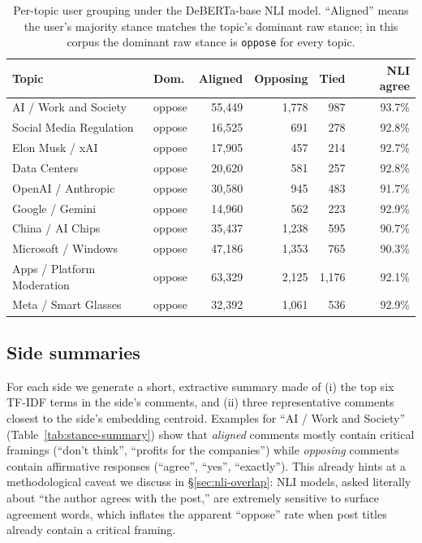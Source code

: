 \documentclass[11pt,a4paper]{article}
\begin{document}
\begin{table}[H]
\centering
\footnotesize
\caption{Per-topic user grouping under the DeBERTa-base NLI model. ``Aligned'' means the user's
majority stance matches the topic's dominant raw stance; in this corpus the dominant raw stance is
\texttt{oppose} for every topic.}
\label{tab:user-groups}
\renewcommand{\arraystretch}{1.12}
\begin{tabular}{p{3.4cm} l r r r r}
\toprule
\textbf{Topic} & \textbf{Dom.} & \textbf{Aligned} & \textbf{Opposing} & \textbf{Tied} & \textbf{NLI agree} \\
\midrule
AI / Work and Society & oppose & 55{,}449 & 1{,}778 & 987 & 93.7\% \\
Social Media Regulation & oppose & 16{,}525 & 691 & 278 & 92.8\% \\
Elon Musk / xAI & oppose & 17{,}905 & 457 & 214 & 92.7\% \\
Data Centers & oppose & 20{,}620 & 581 & 257 & 92.8\% \\
OpenAI / Anthropic & oppose & 30{,}580 & 945 & 483 & 91.7\% \\
Google / Gemini & oppose & 14{,}960 & 562 & 223 & 92.9\% \\
China / AI Chips & oppose & 35{,}437 & 1{,}238 & 595 & 90.7\% \\
Microsoft / Windows & oppose & 47{,}186 & 1{,}353 & 765 & 90.3\% \\
Apps / Platform Moderation & oppose & 63{,}329 & 2{,}125 & 1{,}176 & 92.1\% \\
Meta / Smart Glasses & oppose & 32{,}392 & 1{,}061 & 536 & 92.9\% \\
\bottomrule
\end{tabular}
\end{table}

\subsection{Side summaries}
For each side we generate a short, extractive summary made of (i) the top six TF-IDF terms in the
side's comments, and (ii) three representative comments closest to the side's embedding centroid.
Examples for ``AI / Work and Society'' (Table~\ref{tab:stance-summary}) show that \emph{aligned}
comments mostly contain critical framings (``don't think'', ``profits for the companies'') while
\emph{opposing} comments contain affirmative responses (``agree'', ``yes'', ``exactly''). This
already hints at a methodological caveat we discuss in \S\ref{sec:nli-overlap}: NLI models, asked
literally about ``the author agrees with the post,'' are extremely sensitive to surface
agreement words, which inflates the apparent ``oppose'' rate when post titles already contain a
critical framing.
\end{document}

